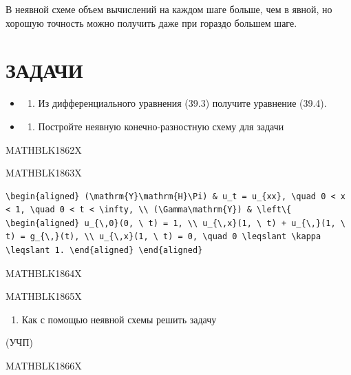\documentclass[
]{article}
\providecommand{\tightlist}{%
  \setlength{\itemsep}{0pt}\setlength{\parskip}{0pt}}
\begin{document}
В неявной схеме объем вычислений на каждом шаге больше, чем в явной, но
хорошую точность можно получить даже при гораздо большем шаге.

\section{ЗАДАЧИ}\label{ux437ux430ux434ux430ux447ux438-6}

\begin{itemize}
\tightlist
\item
  \begin{enumerate}
  \def\labelenumi{\arabic{enumi}.}
  \tightlist
  \item
    Из дифференциального уравнения (39.3) получите уравнение (39.4).
  \end{enumerate}
\item
  \begin{enumerate}
  \def\labelenumi{\arabic{enumi}.}
  \setcounter{enumi}{1}
  \tightlist
  \item
    Постройте неявную конечно-разностную схему для задачи
  \end{enumerate}
\end{itemize}

MATHBLK1862X

MATHBLK1863X

\begin{verbatim}
\begin{aligned} (\mathrm{Y}\mathrm{H}\Pi) & u_t = u_{xx}, \quad 0 < x < 1, \quad 0 < t < \infty, \\ (\Gamma\mathrm{Y}) & \left\{ \begin{aligned} u_{\,0}(0, \ t) = 1, \\ u_{\,x}(1, \ t) + u_{\,}(1, \ t) = g_{\,}(t), \\ u_{\,x}(1, \ t) = 0, \quad 0 \leqslant \kappa \leqslant 1. \end{aligned} \end{aligned}
\end{verbatim}

MATHBLK1864X

MATHBLK1865X

\begin{enumerate}
\def\labelenumi{\arabic{enumi}.}
\setcounter{enumi}{2}
\tightlist
\item
  Как с помощью неявной схемы решить задачу
\end{enumerate}

(УЧП)

MATHBLK1866X
\end{document}
